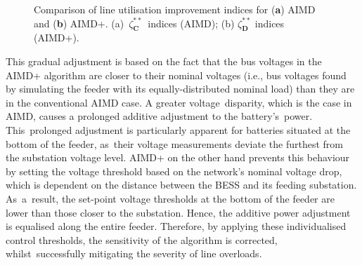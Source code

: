 \begin{figure}\centering
 \caption{Comparison of line utilisation improvement indices for (\textbf{a}) AIMD and (\textbf{b}) AIMD+. ({a})~$\zeta_\textbf{C}^{**}$~indices (AIMD); ({b}) $\zeta_\textbf{D}^{**}$ indices (AIMD+).}
 \label{fig-utilisation-comparison-large}
\end{figure}

This gradual adjustment is based on the fact that the bus voltages in the AIMD+ algorithm are closer to their nominal voltages (i.e., bus voltages found by simulating the feeder with its equally-distributed nominal load) than they are in the conventional AIMD case. A greater voltage~disparity, which is the case in AIMD, causes a prolonged additive adjustment to the battery's~power. This~prolonged adjustment is particularly apparent for batteries situated at the bottom of the feeder, as~their voltage measurements deviate the furthest from the substation voltage level. AIMD+ on the other hand prevents this behaviour by setting the voltage threshold based on the network's nominal voltage drop, which is dependent on the distance between the BESS and its feeding substation. As~a~result, the set-point voltage thresholds at the bottom of the feeder are lower than those closer to the substation. Hence, the additive power adjustment is equalised along the entire feeder. Therefore, by applying these individualised control thresholds, the sensitivity of the algorithm is corrected, whilst~successfully mitigating the severity of line overloads.

